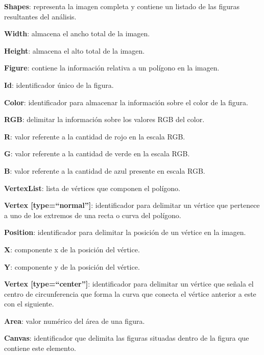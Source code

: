	\begin{longenum}
	\item \textbf{Shapes}: representa la imagen completa y contiene un listado de las figuras resultantes del análisis.
	\item \textbf{Width}: almacena el ancho total de la imagen.
	\item \textbf{Height}: almacena el alto total de la imagen.
	\item \textbf{Figure}: contiene la información relativa a un polígono en la imagen.
		\begin{longenum}
		\item \textbf{Id}: identificador único de la figura.
		\item \textbf{Color}: identificador para almacenar la información sobre el color de la figura.
			\begin{longenum}
			\item \textbf {RGB}: delimitar la información sobre los valores RGB del color.
				\begin{longenum}
				\item \textbf{R}: valor referente a la cantidad de rojo en la escala RGB.
				\item \textbf{G}: valor referente a la cantidad de verde en la escala RGB.
				\item \textbf{B}: valor referente a la cantidad de azul presente en escala RGB.
				\end{longenum}
			\end{longenum}
		\item \textbf{VertexList}: lista de vértices que componen el polígono.
			\begin{longenum}
			\item \textbf{Vertex [type=``normal'']}: identificador para delimitar un vértice que pertenece a uno de los extremos de una recta o curva del polígono.
				\begin{longenum}
					\item \textbf{Position}: identificador para delimitar la posición de un vértice en la imagen.
						\begin{longenum}
						\item \textbf{X}: componente x de la posición del vértice.
						\item \textbf{Y}: componente y de la posición del vértice.
						\end{longenum}
					\item \textbf{Vertex [type=``center'']}: identificador para delimitar un vértice que señala el centro de circunferencia que forma la curva que conecta el vértice anterior a este con el siguiente.
				\end{longenum}
			\end{longenum}
		\end{longenum}
		\item \textbf{Area}: valor numérico del área de una figura.
		\item \textbf{Canvas}: identificador que delimita las figuras situadas dentro de la figura que contiene este elemento. 
	\end{longenum}
	
